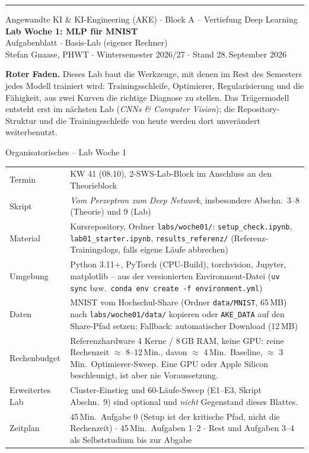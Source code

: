 \documentclass[11pt,a4paper]{article}
\newcommand{\code}[1]{\texttt{#1}}
\begin{document}
{\color{navy}\rule{1.5mm}{2.2cm}}\hspace{4mm}
\begin{minipage}[c]{0.9\textwidth}
  {\small\color{navy}Angewandte KI \& KI-Engineering (AKE) $\cdot$ Block A -- Vertiefung Deep Learning}\\[2pt]
  {\LARGE\bfseries\color{navy}Lab Woche 1: MLP für MNIST}\\[3pt]
  {\large Aufgabenblatt $\cdot$ Basis-Lab (eigener Rechner)}\\[3pt]
  {\small Stefan Gnaase, PHWT $\cdot$ Wintersemester 2026/27 $\cdot$ Stand 28.\,September 2026}
\end{minipage}

\vspace{6pt}
\textbf{Roter Faden.} Dieses Lab baut die Werkzeuge, mit denen im Rest des Semesters jedes Modell trainiert wird: Trainingsschleife, Optimierer, Regularisierung und die Fähigkeit, aus zwei Kurven die richtige Diagnose zu stellen. Das Trägermodell entsteht erst im nächsten Lab (\emph{CNNs \& Computer Vision}); die Repository-Struktur und die Trainingsschleife von heute werden dort unverändert weiterbenutzt.

\begin{orgbox}{Organisatorisches -- Lab Woche 1}
\small
\begin{tabularx}{\textwidth}{@{}p{2.6cm}X@{}}
Termin & KW 41 (08.10), 2-SWS-Lab-Block im Anschluss an den Theorieblock \\
Skript & \emph{Vom Perzeptron zum Deep Network}, insbesondere Abschn.\ 3--8 (Theorie) und 9 (Lab) \\
Material & Kursrepository, Ordner \code{labs/woche01/}: \code{setup\_check.ipynb}, \code{lab01\_starter.ipynb}, \code{results\_referenz/} (Referenz-Trainingslogs, falls eigene Läufe abbrechen) \\
Umgebung & Python 3.11+, PyTorch (CPU-Build), torchvision, Jupyter, matplotlib -- aus der versionierten Environment-Datei (\code{uv sync} bzw.\ \code{conda env create -f environment.yml}) \\
Daten & MNIST vom Hochschul-Share (Ordner \code{data/MNIST}, 65\,MB) nach \code{labs/woche01/data/} kopieren oder \code{AKE\_DATA} auf den Share-Pfad setzen; Fallback: automatischer Download (12\,MB) \\
Rechenbudget & Referenzhardware 4 Kerne / 8\,GB RAM, keine GPU: reine Rechenzeit $\approx$ 8--12\,Min., davon $\approx$ 4\,Min.\ Baseline, $\approx$ 3\,Min.\ Optimierer-Sweep. Eine GPU oder Apple Silicon beschleunigt, ist aber nie Voraussetzung. \\
Erweitertes Lab & Cluster-Einstieg und 60-Läufe-Sweep (E1--E3, Skript Abschn.\ 9) sind optional und \emph{nicht} Gegenstand dieses Blattes. \\
Zeitplan & 45\,Min.\ Aufgabe 0 (Setup ist der kritische Pfad, nicht die Rechenzeit) $\cdot$ 45\,Min.\ Aufgaben 1--2 $\cdot$ Rest und Aufgaben 3--4 als Selbststudium bis zur Abgabe
\end{tabularx}
\end{orgbox}
\end{document}
